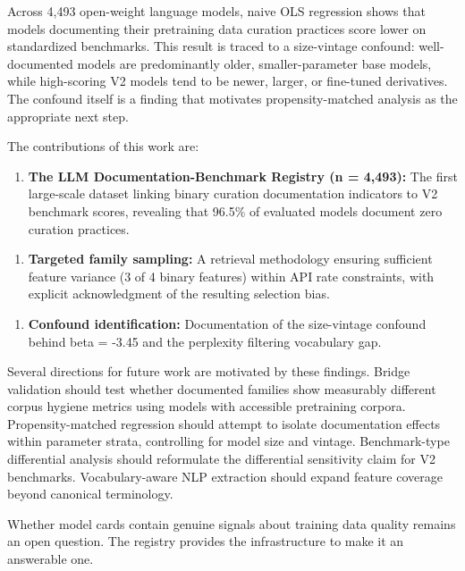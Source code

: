 
Across 4,493 open-weight language models, naive OLS regression shows that models documenting their pretraining data curation practices score lower on standardized benchmarks. This result is traced to a size-vintage confound: well-documented models are predominantly older, smaller-parameter base models, while high-scoring V2 models tend to be newer, larger, or fine-tuned derivatives. The confound itself is a finding that motivates propensity-matched analysis as the appropriate next step.

The contributions of this work are:

\begin{enumerate}
\item \textbf{The LLM Documentation-Benchmark Registry (n = 4,493):} The first large-scale dataset linking binary curation documentation indicators to V2 benchmark scores, revealing that 96.5\% of evaluated models document zero curation practices.
\end{enumerate}

\begin{enumerate}
\item \textbf{Targeted family sampling:} A retrieval methodology ensuring sufficient feature variance (3 of 4 binary features) within API rate constraints, with explicit acknowledgment of the resulting selection bias.
\end{enumerate}

\begin{enumerate}
\item \textbf{Confound identification:} Documentation of the size-vintage confound behind beta = -3.45 and the perplexity filtering vocabulary gap.
\end{enumerate}

Several directions for future work are motivated by these findings. Bridge validation should test whether documented families show measurably different corpus hygiene metrics using models with accessible pretraining corpora. Propensity-matched regression should attempt to isolate documentation effects within parameter strata, controlling for model size and vintage. Benchmark-type differential analysis should reformulate the differential sensitivity claim for V2 benchmarks. Vocabulary-aware NLP extraction should expand feature coverage beyond canonical terminology.

Whether model cards contain genuine signals about training data quality remains an open question. The registry provides the infrastructure to make it an answerable one.
